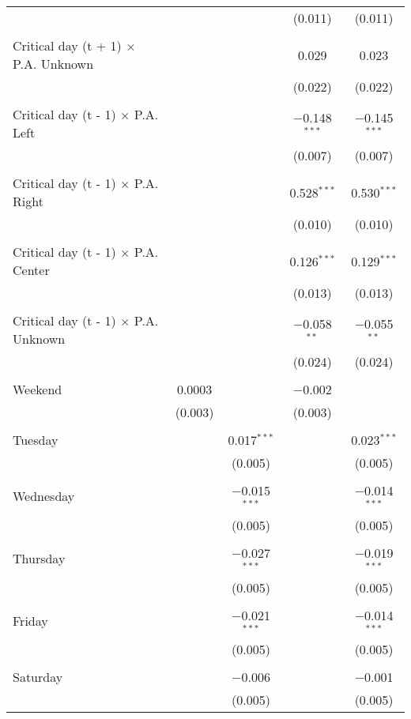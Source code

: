 \documentclass[
]{article}
\begin{document}
\begin{table}[!htbp]
{\begin{tabular}{@{\extracolsep{5pt}}lcccc}
  &  &  & (0.011) & (0.011) \\ 
  & & & & \\ 
 Critical day (t + 1) $\times$ P.A. Unknown &  &  & 0.029 & 0.023 \\ 
  &  &  & (0.022) & (0.022) \\ 
  & & & & \\ 
 Critical day (t - 1) $\times$ P.A. Left &  &  & $-$0.148$^{***}$ & $-$0.145$^{***}$ \\ 
  &  &  & (0.007) & (0.007) \\ 
  & & & & \\ 
 Critical day (t - 1) $\times$ P.A. Right &  &  & 0.528$^{***}$ & 0.530$^{***}$ \\ 
  &  &  & (0.010) & (0.010) \\ 
  & & & & \\ 
 Critical day (t - 1) $\times$ P.A. Center &  &  & 0.126$^{***}$ & 0.129$^{***}$ \\ 
  &  &  & (0.013) & (0.013) \\ 
  & & & & \\ 
 Critical day (t - 1) $\times$ P.A. Unknown &  &  & $-$0.058$^{**}$ & $-$0.055$^{**}$ \\ 
  &  &  & (0.024) & (0.024) \\ 
  & & & & \\ 
 Weekend & 0.0003 &  & $-$0.002 &  \\ 
  & (0.003) &  & (0.003) &  \\ 
  & & & & \\ 
 Tuesday &  & 0.017$^{***}$ &  & 0.023$^{***}$ \\ 
  &  & (0.005) &  & (0.005) \\ 
  & & & & \\ 
 Wednesday &  & $-$0.015$^{***}$ &  & $-$0.014$^{***}$ \\ 
  &  & (0.005) &  & (0.005) \\ 
  & & & & \\ 
 Thursday &  & $-$0.027$^{***}$ &  & $-$0.019$^{***}$ \\ 
  &  & (0.005) &  & (0.005) \\ 
  & & & & \\ 
 Friday &  & $-$0.021$^{***}$ &  & $-$0.014$^{***}$ \\ 
  &  & (0.005) &  & (0.005) \\ 
  & & & & \\ 
 Saturday &  & $-$0.006 &  & $-$0.001 \\ 
  &  & (0.005) &  & (0.005) \\ 

\end{tabular}}
\end{table}
\end{document}
